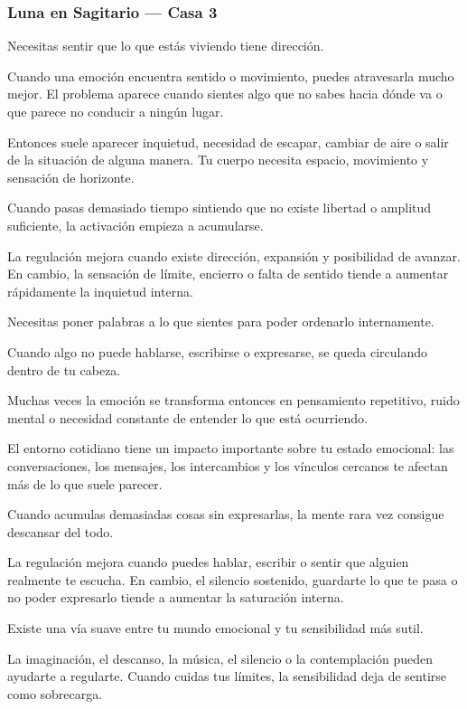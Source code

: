 \documentclass[11pt,a4paper]{article}
\begin{document}
\subsubsection*{Luna en Sagitario — Casa 3}

Necesitas sentir que lo que estás viviendo tiene dirección.

Cuando una emoción encuentra sentido o movimiento, puedes atravesarla mucho mejor. El problema aparece cuando sientes algo que no sabes hacia dónde va o que parece no conducir a ningún lugar.

Entonces suele aparecer inquietud, necesidad de escapar, cambiar de aire o salir de la situación de alguna manera. Tu cuerpo necesita espacio, movimiento y sensación de horizonte.

Cuando pasas demasiado tiempo sintiendo que no existe libertad o amplitud suficiente, la activación empieza a acumularse.

La regulación mejora cuando existe dirección, expansión y posibilidad de avanzar. En cambio, la sensación de límite, encierro o falta de sentido tiende a aumentar rápidamente la inquietud interna.

Necesitas poner palabras a lo que sientes para poder ordenarlo internamente.

Cuando algo no puede hablarse, escribirse o expresarse, se queda circulando dentro de tu cabeza.

Muchas veces la emoción se transforma entonces en pensamiento repetitivo, ruido mental o necesidad constante de entender lo que está ocurriendo.

El entorno cotidiano tiene un impacto importante sobre tu estado emocional: las conversaciones, los mensajes, los intercambios y los vínculos cercanos te afectan más de lo que suele parecer.

Cuando acumulas demasiadas cosas sin expresarlas, la mente rara vez consigue descansar del todo.

La regulación mejora cuando puedes hablar, escribir o sentir que alguien realmente te escucha. En cambio, el silencio sostenido, guardarte lo que te pasa o no poder expresarlo tiende a aumentar la saturación interna.

Existe una vía suave entre tu mundo emocional y tu sensibilidad más sutil.

La imaginación, el descanso, la música, el silencio o la contemplación pueden ayudarte a regularte. Cuando cuidas tus límites, la sensibilidad deja de sentirse como sobrecarga.
\end{document}
